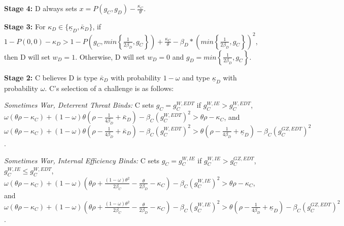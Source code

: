 \documentclass[11pt,letterpaper,pdftex,dvipsnames,table]{article}
\begin{document}
\textbf{Stage 4:} D always sets $x=P(g_{C},g_{D})-\frac{\kappa_{C}}{\theta}.$

\textbf{Stage 3:} For $\kappa_{D}\in\{\underline{\kappa}_{D},\bar{\kappa}_{D}\}$, if $1-P(0,0)-\kappa_{D}>1-P(g_{C},min\left\{ \frac{1}{2\beta_{D}},g_{C}\right\} )+\frac{\kappa_{C}}{\theta}-\beta_{D}*\left(min\left\{ \frac{1}{2\beta_{D}},g_{C}\right\} \right)^{2}$, then D will set $w_{D}=1$. Otherwise, D will set $w_{D}=0$ and $g_{D}=min\left\{ \frac{1}{2\beta_{D}},g_{C}\right\}.$

\textbf{Stage 2:} C believes D is type $\bar{\kappa}_{D}$ with probability $1-\omega$ and type $\underline{\kappa}_{D}$ with probability $\omega$. C's selection of a challenge is as follows:

\textit{Sometimes War, Deterrent Threat Binds:} C sets %
$g_{C}=g_{C}^{W,EDT}$ 
if $g_{C}^{W,IE}>g_{C}^{W,EDT}$, $\omega\left(\theta\rho-\kappa_{C}\right)+(1-\omega)\theta\left(\rho-\frac{1}{4\beta_{D}}+\bar{\kappa}_{D}\right)-\beta_{C}\left(g_{C}^{W,EDT}\right)^{2}>\theta\rho-\kappa_{C}$, and $\omega\left(\theta\rho-\kappa_{C}\right)+(1-\omega)\theta\left(\rho-\frac{1}{4\beta_{D}}+\bar{\kappa}_{D}\right)-\beta_{C}\left(g_{C}^{W,EDT}\right)^{2}>\theta\left(\rho-\frac{1}{4\beta_{D}}+\underline{\kappa}_{D}\right)-\beta_{C}\left(g_{C}^{GZ,EDT}\right)^{2}$.

\textit{Sometimes War, Internal Efficiency Binds:} C sets
$g_{C}=g_{C}^{W,IE}$
if $g_{C}^{W,IE}>g_{C}^{GZ,EDT}$, $g_{C}^{W,IE}\le g_{C}^{W,EDT}$, $\omega\left(\theta\rho-\kappa_{C}\right)+(1-\omega)\left(\theta\rho+\frac{(1-\omega)\theta^{2}}{2\beta_{C}}-\frac{\theta}{2\beta_{D}}-\kappa_{C}\right)-\beta_{C}\left(g_{C}^{W,IE}\right)^{2}>\theta\rho-\kappa_{C}$, and $\omega\left(\theta\rho-\kappa_{C}\right)+(1-\omega)\left(\theta\rho+\frac{(1-\omega)\theta^{2}}{2\beta_{C}}-\frac{\theta}{2\beta_{D}}-\kappa_{C}\right)-\beta_{C}\left(g_{C}^{W,IE}\right)^{2}>\theta\left(\rho-\frac{1}{4\beta_{D}}+\underline{\kappa}_{D}\right)-\beta_{C}\left(g_{C}^{GZ,EDT}\right)^{2}$.
\end{document}
